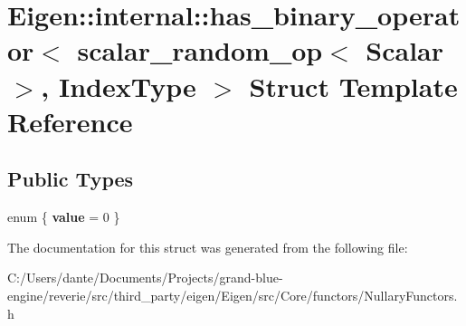 \hypertarget{struct_eigen_1_1internal_1_1has__binary__operator_3_01scalar__random__op_3_01_scalar_01_4_00_01_index_type_01_4}{}\section{Eigen\+::internal\+::has\+\_\+binary\+\_\+operator$<$ scalar\+\_\+random\+\_\+op$<$ Scalar $>$, Index\+Type $>$ Struct Template Reference}
\label{struct_eigen_1_1internal_1_1has__binary__operator_3_01scalar__random__op_3_01_scalar_01_4_00_01_index_type_01_4}
\subsection*{Public Types}
\begin{DoxyCompactItemize}
\item 
\mbox{\label{struct_eigen_1_1internal_1_1has__binary__operator_3_01scalar__random__op_3_01_scalar_01_4_00_01_index_type_01_4_a2cfdd83c65a90b0de13fd9cb46a60fcc}} 
enum \{ {\bfseries value} = 0
 \}
\end{DoxyCompactItemize}


The documentation for this struct was generated from the following file\+:\begin{DoxyCompactItemize}
\item 
C\+:/\+Users/dante/\+Documents/\+Projects/grand-\/blue-\/engine/reverie/src/third\+\_\+party/eigen/\+Eigen/src/\+Core/functors/Nullary\+Functors.\+h\end{DoxyCompactItemize}
